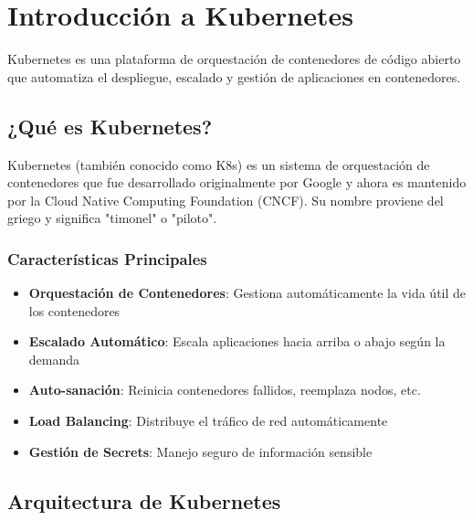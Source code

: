 \documentclass[11pt,a4paper]{article}
\begin{document}
\tableofcontents
\newpage

\section{Introducción a Kubernetes}

\begin{infobox}
Kubernetes es una plataforma de orquestación de contenedores de código abierto que automatiza el despliegue, escalado y gestión de aplicaciones en contenedores.
\end{infobox}

\subsection{¿Qué es Kubernetes?}

Kubernetes (también conocido como K8s) es un sistema de orquestación de contenedores que fue desarrollado originalmente por Google y ahora es mantenido por la Cloud Native Computing Foundation (CNCF). Su nombre proviene del griego y significa "timonel" o "piloto".

\subsubsection{Características Principales}

\begin{itemize}[leftmargin=2cm]
    \item[\textcolor{k8sblue}{\faDocker}] \textbf{Orquestación de Contenedores}: Gestiona automáticamente la vida útil de los contenedores
    \item[\textcolor{k8ssuccess}{\faArrowsAltH}] \textbf{Escalado Automático}: Escala aplicaciones hacia arriba o abajo según la demanda
    \item[\textcolor{k8swarning}{\faHeart}] \textbf{Auto-sanación}: Reinicia contenedores fallidos, reemplaza nodos, etc.
    \item[\textcolor{k8ssteelblue}{\faBalanceScale}] \textbf{Load Balancing}: Distribuye el tráfico de red automáticamente
    \item[\textcolor{k8serror}{\faLock}] \textbf{Gestión de Secrets}: Manejo seguro de información sensible
\end{itemize}

\subsection{Arquitectura de Kubernetes}
\end{document}
